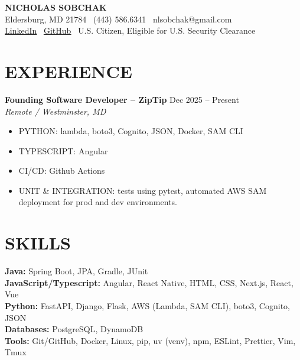 \documentclass[11pt]{article}
\begin{document}
{\LARGE \textbf{\color{accent} NICHOLAS SOBCHAK}}\\
Eldersburg, MD 21784 \textbar\ (443) 586.6341 \textbar\ nlsobchak@gmail.com\\
\underline{\href{https://linkedin.com/in/nicholas-sobchak-b4aa2a329}{LinkedIn}} \textbar\ 
\underline{\href{https://github.com/nickczak}{GitHub}} \textbar\ 
U.S. Citizen, Eligible for U.S. Security Clearance

\section*{EXPERIENCE}
\textbf{Founding Software Developer -- ZipTip} \hfill Dec 2025 -- Present\\
\textit{Remote / Westminster, MD}
\begin{itemize}[label=\texttt{\textbf{>}}]
  \item PYTHON: lambda, boto3, Cognito, JSON, Docker, SAM CLI
  \item TYPESCRIPT: Angular
  \item CI/CD: Github Actions
  \item UNIT \& INTEGRATION: tests using pytest, automated AWS SAM deployment for prod and dev environments.
\end{itemize}

\section*{SKILLS}
\textbf{Java:} Spring Boot, JPA, Gradle, JUnit \\
\textbf{JavaScript/Typescript:} Angular, React Native, HTML, CSS, Next.js, React, Vue  \\
\textbf{Python:} FastAPI, Django, Flask, AWS (Lambda, SAM CLI), boto3, Cognito, JSON \\
\textbf{Databases:} PostgreSQL, DynamoDB \\
\textbf{Tools:} Git/GitHub, Docker, Linux, pip, uv (venv), npm, ESLint, Prettier, Vim, Tmux

\end{document}
